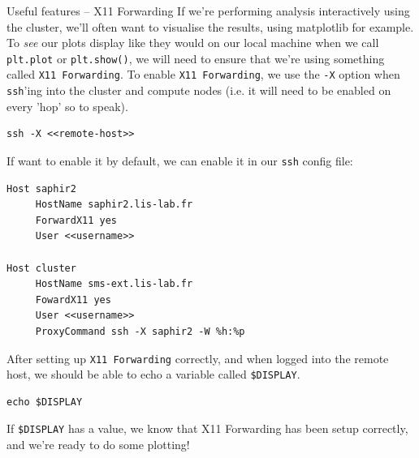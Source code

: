 \documentclass[10pt]{beamer}
\begin{document}
\begin{frame}[fragile,allowframebreaks,label=]{Useful features -- X11 Forwarding}
 If we're performing analysis interactively using the cluster, we'll often want to
visualise the results, using matplotlib for example. To \emph{see} our plots display like
they would on our local machine when we call \texttt{plt.plot} or \texttt{plt.show()}, we will need to
ensure that we're using something called \texttt{X11 Forwarding}. To enable \texttt{X11 Forwarding}, we
use the \texttt{-X} option when \texttt{ssh}'ing into the cluster and compute nodes (i.e. it will need
to be enabled on every 'hop' so to speak).

\begin{verbatim}
ssh -X <<remote-host>>
\end{verbatim}

If want to enable it by default, we can enable it in our \texttt{ssh} config file:

\begin{verbatim}
Host saphir2
     HostName saphir2.lis-lab.fr
     ForwardX11 yes
     User <<username>>

Host cluster
     HostName sms-ext.lis-lab.fr
     FowardX11 yes
     User <<username>>
     ProxyCommand ssh -X saphir2 -W %h:%p
\end{verbatim}

After setting up \texttt{X11 Forwarding} correctly, and when logged into the remote host, we
should be able to echo a variable called \texttt{\$DISPLAY}.

\begin{verbatim}
echo $DISPLAY
\end{verbatim}

If \texttt{\$DISPLAY} has a value, we know that X11 Forwarding has been setup correctly, and
we're ready to do some plotting!
\end{frame}
\end{document}
